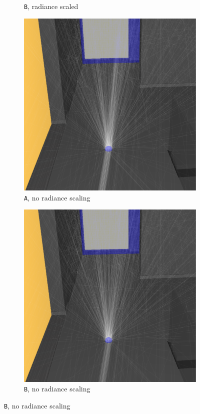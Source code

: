 \begin{figure}
\begin{subfigure}[t]{0.49\linewidth}
		\caption{\texttt{B}, radiance scaled}
		\label{wrong2pathsscaled}
	\end{subfigure}
	\begin{subfigure}[t]{0.49\linewidth}
		\includegraphics[width=\textwidth]{chapters/chapter_results/correct2paths}
		\caption{\texttt{A}, no radiance scaling}
	\end{subfigure}
	\begin{subfigure}[t]{0.49\linewidth}
		\includegraphics[width=\textwidth]{chapters/chapter_results/wrong2paths}
		\caption{\texttt{B}, no radiance scaling}
	\end{subfigure}


\end{figure}
